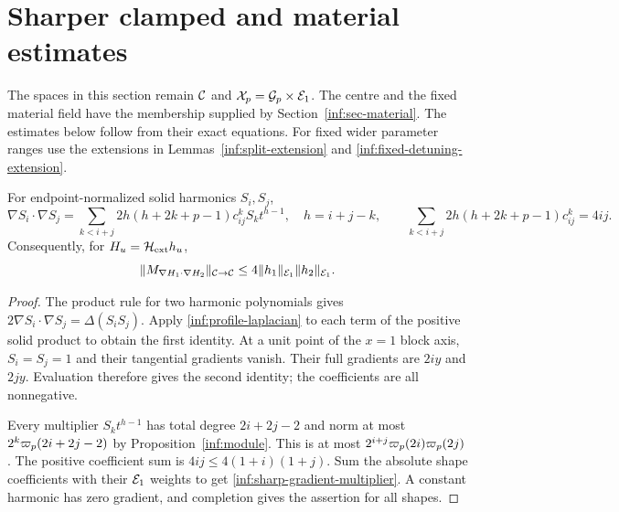 \section{Sharper clamped and material estimates}\label{inf:sec-sharp}

The spaces in this section remain $\mathcal C$ and $\mathcal X_p=\mathcal{G}_p\times\mathcal E_1$.
The centre and the fixed material field have the membership supplied
by Section~\ref{inf:sec-material}. The estimates below follow from
their exact equations.
For fixed wider parameter ranges use the extensions in
Lemmas~\ref{inf:split-extension} and \ref{inf:fixed-detuning-extension}.

\begin{lemma}\label{inf:pole-sum}
For endpoint-normalized solid harmonics $S_i,S_j$,
\begin{equation}\label{inf:pole-sum-identity}
 \nabla S_i\cdot\nabla S_j
 =\sum_{k<i+j}2h(h+2k+p-1)c_{ij}^kS_kt^{h-1},\quad h=i+j-k,
 \qquad
 \sum_{k<i+j}2h(h+2k+p-1)c_{ij}^k=4ij.
\end{equation}
Consequently, for $H_u=\mathcal H_{\mathrm{ext}} h_u$,
\begin{equation}\label{inf:sharp-gradient-multiplier}
 \lVert M_{\nabla H_1\cdot\nabla H_2}\rVert_{\mathcal C\to\mathcal C}
 \le4\lVert h_1\rVert_{\mathcal E_1}\lVert h_2\rVert_{\mathcal E_1}.
\end{equation}
\end{lemma}
\begin{proof}
The product rule for two harmonic polynomials gives
$2\nabla S_i\cdot\nabla S_j=\Delta(S_iS_j)$.
Apply \eqref{inf:profile-laplacian} to each term of the positive solid
product to obtain the first identity. At a unit point of the $x=1$
block axis, $S_i=S_j=1$ and their tangential gradients vanish.
Their full gradients are $2iy$ and $2jy$. Evaluation therefore gives
the second identity; the coefficients are all nonnegative.

Every multiplier $S_kt^{h-1}$ has total degree $2i+2j-2$ and norm
at most $2^k\varpi_p(2i+2j-2)$ by Proposition~\ref{inf:module}.
This is at most $2^{i+j}\varpi_p(2i)\varpi_p(2j)$.
The positive coefficient sum is $4ij\le4(1+i)(1+j)$.
Sum the absolute shape coefficients with their $\mathcal E_1$ weights
to get \eqref{inf:sharp-gradient-multiplier}. A constant harmonic
has zero gradient, and completion gives the assertion for all shapes.
\end{proof}

